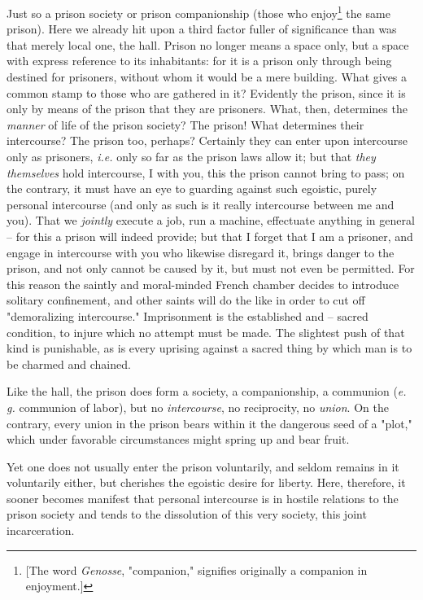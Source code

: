 Just so a prison society or prison companionship (those who 
enjoy\footnote{[The word \textit{Genosse}, "{}companion,"{} signifies 
originally a companion in enjoyment.]} the same prison). Here we already hit 
upon a third factor fuller of significance than was that merely local one, the 
hall. Prison no longer means a space only, but a space with express reference 
to its inhabitants: for it is a prison only through being destined for 
prisoners, without whom it would be a mere building. What gives a common stamp 
to those who are gathered in it? Evidently the prison, since it is only by 
means of the prison that they are prisoners. What, then, determines the 
\textit{manner} of life of the prison society? The prison! What determines 
their intercourse? The prison too, perhaps? Certainly they can enter upon 
intercourse only as prisoners, \textit{i.e.} only so far as the prison laws 
allow it; but that \textit{they themselves} hold intercourse, I with you, this 
the prison cannot bring to pass; on the contrary, it must have an eye to 
guarding against such egoistic, purely personal intercourse (and only as such 
is it really intercourse between me and you). That we \textit{jointly} execute 
a job, run a machine, effectuate anything in general -- for this a prison will 
indeed provide; but that I forget that I am a prisoner, and engage in 
intercourse with you who likewise disregard it, brings danger to the prison, 
and not only cannot be caused by it, but must not even be permitted. For this 
reason the saintly and moral-minded French chamber decides to introduce 
solitary confinement, and other saints will do the like in order to cut off 
"{}demoralizing intercourse."{} Imprisonment is the established and -- sacred 
condition, to injure which no attempt must be made. The slightest push of that 
kind is punishable, as is every uprising against a sacred thing by which man 
is to be charmed and chained.

Like the hall, the prison does form a society, a companionship, a communion 
(\textit{e. g.} communion of labor), but no \textit{intercourse}, no 
reciprocity, no \textit{union}. On the contrary, every union in the prison 
bears within it the dangerous seed of a "{}plot,"{} which under favorable 
circumstances might spring up and bear fruit.

Yet one does not usually enter the prison voluntarily, and seldom remains in 
it voluntarily either, but cherishes the egoistic desire for liberty. Here, 
therefore, it sooner becomes manifest that personal intercourse is in hostile 
relations to the prison society and tends to the dissolution of this very 
society, this joint incarceration.

